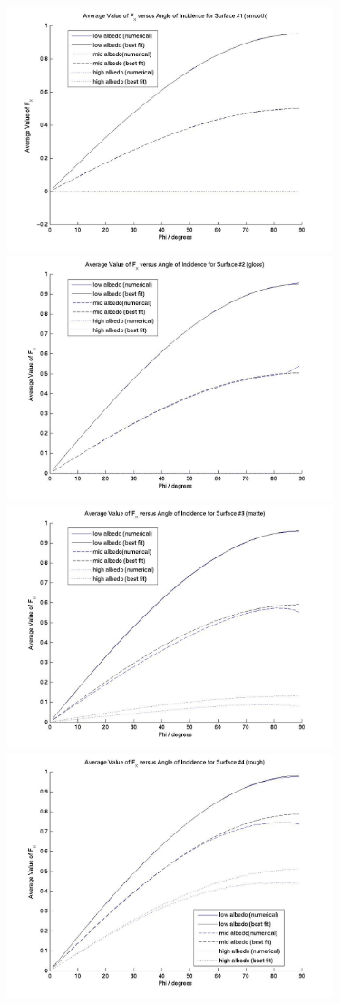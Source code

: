 \begin{description}
      \begin{figure}[!ht]
        \includegraphics[width=95mm]{figs/sda/F__x_diff_smooth.jpg}
        \includegraphics[width=95mm]{figs/sda/F__x_diff__gloss.jpg}
        \includegraphics[width=95mm]{figs/sda/F__x_diff__matte.jpg}
        \includegraphics[width=95mm]{figs/sda/F__x_diff__rough.jpg}

\end{figure}
\end{description}
